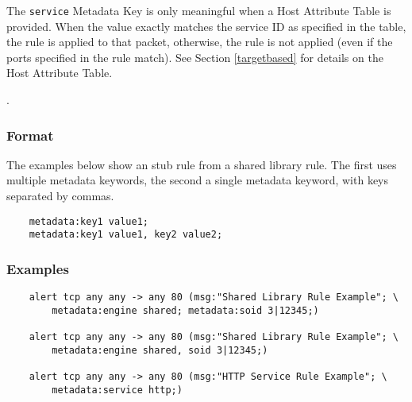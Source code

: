 \documentclass[english]{report}
\newenvironment{note}{
\samepage
    \vspace{10pt}{\textsf{
        {\hspace{7pt}\Huge{$\triangle$\hspace{-12.5pt}{\Large{$^!$}}}}\hspace{5pt}
        {\Large{NOTE}}
    }
    }
   \begin{center}
    \par\vspace{-17pt}

    \begin{lrbox}{\savepar}
    \begin{minipage}[r]{6in}
}
{
    \end{minipage}
    \end{lrbox}
    \fbox{
        \usebox{
            \savepar
	}
    }
    \par\vskip10pt
    \end{center}
}
\newenvironment{note}{
        \begin{rawhtml}
        <p><table border="1"><tr><td><b>
        Note:&nbsp;&nbsp;</b>
        \end{rawhtml}
}{
        \begin{rawhtml}
        </b></td></tr></table></p>
        \end{rawhtml}
}
\begin{document}
\begin{note}

The \texttt{service} Metadata Key is only meaningful when a Host Attribute
Table is provided.  When the value exactly matches the service ID as specified
in the table, the rule is applied to that packet, otherwise, the rule is not
applied (even if the ports specified in the rule match).  See Section
\ref{targetbased} for details on the Host Attribute Table.

\end{note}.

\subsubsection{Format}

The examples below show an stub rule from a shared library rule.  The first
uses multiple metadata keywords, the second a single metadata keyword, with
keys separated by commas.

\begin{verbatim}
    metadata:key1 value1;
    metadata:key1 value1, key2 value2;
\end{verbatim}

\subsubsection{Examples}

\begin{verbatim}
    alert tcp any any -> any 80 (msg:"Shared Library Rule Example"; \
        metadata:engine shared; metadata:soid 3|12345;)

    alert tcp any any -> any 80 (msg:"Shared Library Rule Example"; \
        metadata:engine shared, soid 3|12345;)

    alert tcp any any -> any 80 (msg:"HTTP Service Rule Example"; \
        metadata:service http;)
\end{verbatim}
\end{document}
